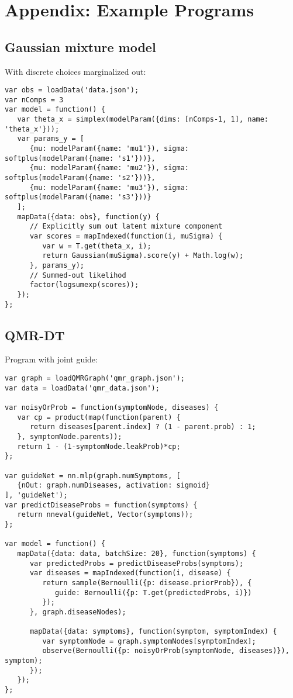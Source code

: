 \section{Appendix: Example Programs}
\label{sec:appendix_code}

\subsection{Gaussian mixture model}
\label{sec:appendix_code:gmmSumOut}

With discrete choices marginalized out:
\begin{lstlisting}
var obs = loadData('data.json');
var nComps = 3
var model = function() {
   var theta_x = simplex(modelParam({dims: [nComps-1, 1], name: 'theta_x'}));
   var params_y = [
      {mu: modelParam({name: 'mu1'}), sigma: softplus(modelParam({name: 's1'}))},
      {mu: modelParam({name: 'mu2'}), sigma: softplus(modelParam({name: 's2'}))},
      {mu: modelParam({name: 'mu3'}), sigma: softplus(modelParam({name: 's3'}))}
   ];
   mapData({data: obs}, function(y) {
      // Explicitly sum out latent mixture component
      var scores = mapIndexed(function(i, muSigma) {
         var w = T.get(theta_x, i);
         return Gaussian(muSigma).score(y) + Math.log(w);
      }, params_y);
      // Summed-out likelihod
      factor(logsumexp(scores));
   });
};
\end{lstlisting}

\subsection{QMR-DT}
\label{sec:appendix_code:qmr}

Program with joint guide:
\begin{lstlisting}
var graph = loadQMRGraph('qmr_graph.json');
var data = loadData('qmr_data.json');

var noisyOrProb = function(symptomNode, diseases) {
   var cp = product(map(function(parent) {
      return diseases[parent.index] ? (1 - parent.prob) : 1;
   }, symptomNode.parents));
   return 1 - (1-symptomNode.leakProb)*cp;
};

var guideNet = nn.mlp(graph.numSymptoms, [
   {nOut: graph.numDiseases, activation: sigmoid}
], 'guideNet');
var predictDiseaseProbs = function(symptoms) {
   return nneval(guideNet, Vector(symptoms));
};

var model = function() {
   mapData({data: data, batchSize: 20}, function(symptoms) {
      var predictedProbs = predictDiseaseProbs(symptoms);
      var diseases = mapIndexed(function(i, disease) {
         return sample(Bernoulli({p: disease.priorProb}), {
            guide: Bernoulli({p: T.get(predictedProbs, i)})
         });
      }, graph.diseaseNodes);

      mapData({data: symptoms}, function(symptom, symptomIndex) {
         var symptomNode = graph.symptomNodes[symptomIndex];
         observe(Bernoulli({p: noisyOrProb(symptomNode, diseases)}), symptom);
      });
   });
};
\end{lstlisting}

